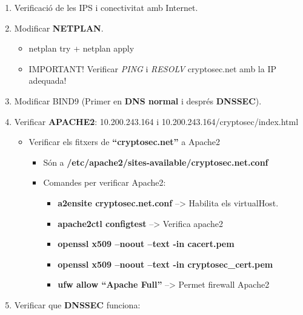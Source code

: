 \documentclass[]{article}
\begin{document}
\begin{enumerate}
\def\labelenumi{\arabic{enumi}.}
\item
  Verificació de les IPS i conectivitat amb Internet.
\item
  Modificar \textbf{NETPLAN}.

  \begin{itemize}
  \item
    netplan try + netplan apply
  \item
    IMPORTANT! Verificar \emph{PING} i \emph{RESOLV} cryptosec.net amb
    la IP adequada!
  \end{itemize}
\item
  Modificar BIND9 (Primer en \textbf{DNS normal} i després
  \textbf{DNSSEC}).
\item
  Verificar \textbf{APACHE2}: 10.200.243.164 i
  10.200.243.164/cryptosec/index.html

  \begin{itemize}
  \item
    Verificar els fitxers de \textbf{``cryptosec.net''} a Apache2

    \begin{itemize}
    \item
      Són a \textbf{/etc/apache2/sites-available/cryptosec.net.conf}
    \item
      Comandes per verificar Apache2:

      \begin{itemize}
      \item
        \textbf{a2ensite cryptosec.net.conf} --\textgreater{} Habilita
        els virtualHost.
      \item
        \textbf{apache2ctl configtest} --\textgreater{} Verifica apache2
      \item
        \textbf{openssl x509 --noout --text -in cacert.pem}
      \item
        \textbf{openssl x509 --noout --text -in cryptosec\_cert.pem}
      \item
        \textbf{ufw allow ``Apache Full''} --\textgreater{} Permet
        firewall Apache2
      \end{itemize}
    \end{itemize}
  \end{itemize}
\item
  Verificar que \textbf{DNSSEC} funciona:


\end{enumerate}
\end{document}
